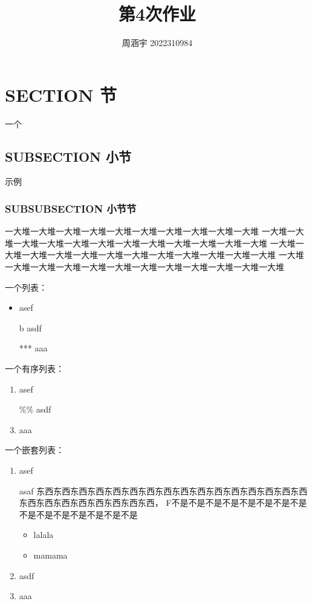 \documentclass[UTF8,zihao=5]{ctexart} %
\title{{\bfseries 第4次作业}}
\author{周涵宇 2022310984}
\date{}
\begin{document}
\maketitle
\begin{center}
    \rmfamily
    \tableofcontents\setcounter{page}{0}
\end{center}
\thispagestyle{empty}

\newpage


\section{SECTION 节}

一个

\subsection{SUBSECTION 小节}

示例

\subsubsection{SUBSUBSECTION 小节节}

一大堆一大堆一大堆一大堆一大堆一大堆一大堆一大堆一大堆一大堆
一大堆一大堆一大堆一大堆一大堆一大堆一大堆一大堆一大堆一大堆一大堆一大堆
一大堆一大堆一大堆一大堆一大堆一大堆一大堆一大堆一大堆一大堆一大堆一大堆
一大堆一大堆一大堆一大堆一大堆一大堆一大堆一大堆一大堆一大堆一大堆一大堆

一个列表：
\begin{itemize}
    \item asef
    \item[b] asdf
    \item[***] aaa
\end{itemize}

一个有序列表：
\begin{enumerate}
    \item asef
    \item[\%\%] asdf
    \item aaa
\end{enumerate}

一个嵌套列表：
\begin{enumerate}[itemindent=2em] %
    \item asef \par asaf 东西东西东西东西东西东西东西东西东西东西东西东西东西东西东西东西东西东西东西东西东西东西东西东西，
          F不是不是不是不是不是不是不是不是不是不是不是不是不是不是不是
          \begin{itemize}[itemindent=2em]  %
              \item lalala
              \item mamama
          \end{itemize}
    \item asdf
    \item aaa
\end{enumerate}
\end{document}
